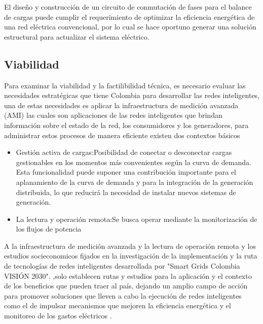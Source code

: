 \documentclass[12pt,letterpaper]{article}
\begin{document}
El diseño y construcción  de un circuito de conmutación de fases para el balance de cargas puede cumplir el requerimiento de optimizar la eficiencia  energética de una red eléctrica convencional, por lo cual se hace oportuno generar una solución estructural para actualizar el sistema eléctrico.   
\subsection{Viabilidad}

  Para examinar la viabilidad y la  factilibilidad técnica, es necesario evaluar las necesidades estratégicas que tiene Colombia para desarrollar las redes inteligentes, una de estas necesidades es aplicar la infraestructura de medición avanzada (AMI) las cuales son aplicaciones de las redes inteligentes que brindan información sobre el estado de la red, los consumidores y los generadores, para administrar estos procesos de manera eficiente existen dos contextos básicos \cite{ColombiaInteligente2016}
   \begin{itemize}
   	\item Gestión activa de cargas:Posibilidad de conectar o desconectar cargas gestionables en los momentos más convenientes según la curva de demanda. Esta funcionalidad puede suponer una contribución importante para el aplanamiento de la curva de demanda y para la integración de la generación distribuida, lo que reducirá la necesidad de instalar nuevos sistemas de generación.  \cite{Taylor2005}
   	\item  La lectura y operación remota:Se busca operar mediante la monitorización de los flujos de potencia \cite{ColombiaInteligente2016}    
   \end{itemize}
     
  A la infraestructura de medición avanzada y la lectura de operación remota y los estudios socieconomicos fijados en la investigación de la implementación y la ruta de tecnologías de redes inteligentes  desarrollada por "Smart Grids Colombia VISIÓN 2030". \cite{UPME2016},solo establecen rutas y estudios para la aplicación y el contexto de los beneficios que pueden traer al país, dejando un amplio campo de acción para promover soluciones que lleven a cabo la ejecución de redes inteligentes como el de impulsar mecanismos que mejoren la eficiencia energética y el monitoreo de los gastos eléctricos .   
  
\end{document}
